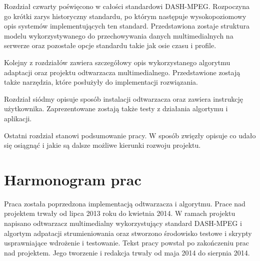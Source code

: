 Rozdział czwarty poświęcono w całości standardowi DASH-MPEG. Rozpoczyna go krótki zarys historyczny standardu, po którym następuje wysokopoziomowy opis systemów implementujących ten standard. Przedstawiona zostaje struktura modelu wykorzystywanego do przechowywania danych multimedialnych na serwerze oraz pozostałe opcje standardu takie jak osie czasu i profile.

Kolejny z rozdziałów zawiera szczegółowy opis wykorzystanego algorytmu adaptacji oraz projektu odtwarzacza multimedialnego. Przedstawione zostają także narzędzia, które posłużyły do implementacji rozwiązania.

Rozdział siódmy opisuje sposób instalacji odtwarzacza oraz zawiera instrukcję użytkownika. Zaprezentowane zostają także testy z działania algortymu i aplikacji.

Ostatni rozdział stanowi podsumowanie pracy. W sposób zwięzły opisuje co udało się osiągnąć i jakie są dalsze możliwe kierunki rozwoju projektu.

\section{Harmonogram prac}

Praca została poprzedzona implementacją odtwarzacza i algorytmu. Prace nad projektem trwały od lipca 2013 roku do kwietnia 2014. W ramach projektu napisano odtwarzacz multimedialny wykorzystujący standard DASH-MPEG i algortym adpatacji strumieniowania oraz stworzono środowisko testowe i skrypty usprawniające wdrożenie i testowanie. Tekst pracy powstał po zakończeniu prac nad projektem. Jego tworzenie i redakcja trwały od maja 2014 do sierpnia 2014.
